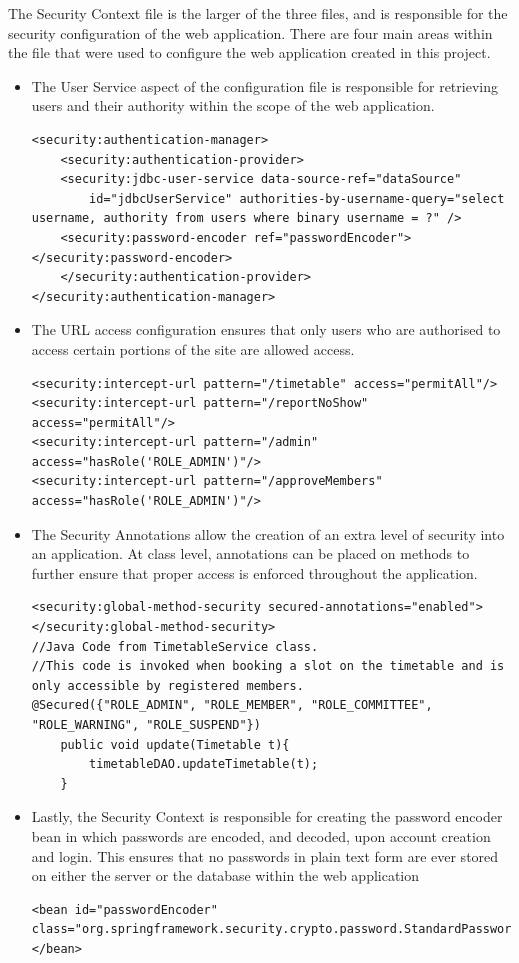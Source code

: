 The Security Context file is the larger of the three files, and is responsible for the security configuration of the web application. There are four main areas within the file that were used to configure the web application created in this project.
\begin{itemize}
\item The User Service aspect of the configuration file is responsible for retrieving users and their authority within the scope of the web application.
\begin{lstlisting}
<security:authentication-manager>	
	<security:authentication-provider>
	<security:jdbc-user-service data-source-ref="dataSource"
		id="jdbcUserService" authorities-by-username-query="select username, authority from users where binary username = ?" />
	<security:password-encoder ref="passwordEncoder"></security:password-encoder>
	</security:authentication-provider>
</security:authentication-manager>
\end{lstlisting}
\item The URL access configuration ensures that only users who are authorised to access certain portions of the site are allowed access.
\begin{lstlisting}
<security:intercept-url pattern="/timetable" access="permitAll"/>
<security:intercept-url pattern="/reportNoShow" access="permitAll"/>
<security:intercept-url pattern="/admin" access="hasRole('ROLE_ADMIN')"/>
<security:intercept-url pattern="/approveMembers" access="hasRole('ROLE_ADMIN')"/>
\end{lstlisting}
\item The Security Annotations allow the creation of an extra level of security into an application. At class level, annotations can be placed on methods to further ensure that proper access is enforced throughout the application.
\begin{lstlisting}
<security:global-method-security secured-annotations="enabled"></security:global-method-security>
//Java Code from TimetableService class. 
//This code is invoked when booking a slot on the timetable and is only accessible by registered members.
@Secured({"ROLE_ADMIN", "ROLE_MEMBER", "ROLE_COMMITTEE", "ROLE_WARNING", "ROLE_SUSPEND"})
	public void update(Timetable t){
		timetableDAO.updateTimetable(t);
	}
\end{lstlisting}
\item Lastly, the Security Context is responsible for creating the password encoder bean in which passwords are encoded, and decoded, upon account creation and login. This ensures that no passwords in plain text form are ever stored on either the server or the database within the web application
\begin{lstlisting}
<bean id="passwordEncoder"
class="org.springframework.security.crypto.password.StandardPasswordEncoder">
</bean>
\end{lstlisting}
\end{itemize}

